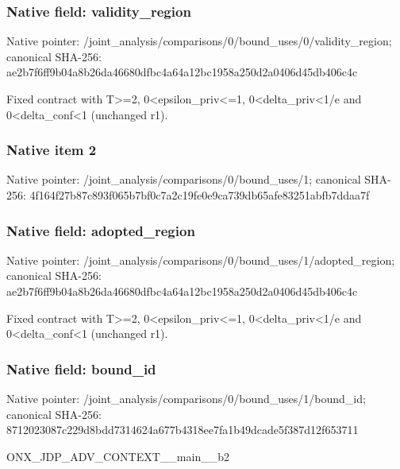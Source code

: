 \documentclass[10pt,a4paper]{article}
\begin{document}
\subsubsection{Native field: validity\_\allowbreak{}region}
Native pointer: /joint\_\allowbreak{}analysis/comparisons/0/bound\_\allowbreak{}uses/0/validity\_\allowbreak{}region; canonical SHA-256: ae2b7f6ff9b04a8b26da46680dfbc4a64a12bc1958a250d2a0406d45db406c4c

\begingroup\raggedright\sloppy Fixed contract with T>=\allowbreak{}2,\allowbreak{} 0<epsilon\_\allowbreak{}priv<=\allowbreak{}1,\allowbreak{} 0<delta\_\allowbreak{}priv<1/\allowbreak{}e and 0<delta\_\allowbreak{}conf<1 (unchanged r1).\par\endgroup

\subsubsection{Native item 2}
Native pointer: /joint\_\allowbreak{}analysis/comparisons/0/bound\_\allowbreak{}uses/1; canonical SHA-256: 4f164f27b87c893f065b7bf0c7a2c19fe0e9ca739db65afe83251abfb7ddaa7f

\subsubsection{Native field: adopted\_\allowbreak{}region}
Native pointer: /joint\_\allowbreak{}analysis/comparisons/0/bound\_\allowbreak{}uses/1/adopted\_\allowbreak{}region; canonical SHA-256: ae2b7f6ff9b04a8b26da46680dfbc4a64a12bc1958a250d2a0406d45db406c4c

\begingroup\raggedright\sloppy Fixed contract with T>=\allowbreak{}2,\allowbreak{} 0<epsilon\_\allowbreak{}priv<=\allowbreak{}1,\allowbreak{} 0<delta\_\allowbreak{}priv<1/\allowbreak{}e and 0<delta\_\allowbreak{}conf<1 (unchanged r1).\par\endgroup

\subsubsection{Native field: bound\_\allowbreak{}id}
Native pointer: /joint\_\allowbreak{}analysis/comparisons/0/bound\_\allowbreak{}uses/1/bound\_\allowbreak{}id; canonical SHA-256: 8712023087c229d8bdd7314624a677b4318ee7fa1b49dcade5f387d12f653711

\begingroup\raggedright\sloppy ONX\_\allowbreak{}JDP\_\allowbreak{}ADV\_\allowbreak{}CONTEXT\_\allowbreak{}\_\allowbreak{}main\_\allowbreak{}\_\allowbreak{}b2\par\endgroup
\end{document}
